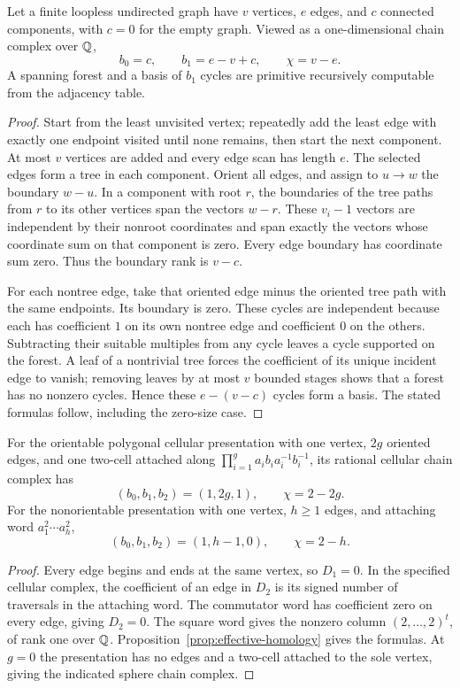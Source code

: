 \begin{theorem}
\label{thm:graph-betti}
Let a finite loopless undirected graph have $v$ vertices, $e$ edges, and
$c$ connected components, with $c=0$ for the empty graph.  Viewed as a
one-dimensional chain complex over $\mathbb Q$,
\[
 b_0=c,\qquad b_1=e-v+c,\qquad \chi=v-e.
\]
A spanning forest and a basis of $b_1$ cycles are primitive recursively
computable from the adjacency table.
\end{theorem}
\begin{proof}
Start from the least unvisited vertex; repeatedly add the least edge with
exactly one endpoint visited until none remains, then start the next
component.  At most $v$ vertices are added and every edge scan has length
$e$.  The selected edges form a tree in each component.  Orient all
edges, and assign to $u\to w$ the boundary $w-u$.  In a component with
root $r$, the boundaries of the tree paths from $r$ to its other vertices
span the vectors $w-r$.  These $v_i-1$ vectors are independent by their
nonroot coordinates and span exactly the vectors whose coordinate sum on
that component is zero.  Every edge boundary has coordinate sum zero.
Thus the boundary rank is $v-c$.

For each nontree edge, take that oriented edge minus the oriented tree
path with the same endpoints.  Its boundary is zero.  These cycles are
independent because each has coefficient $1$ on its own nontree edge
and coefficient $0$ on the others.  Subtracting their suitable multiples
from any cycle leaves a cycle supported on the forest.  A leaf of a
nontrivial tree forces the coefficient of its unique incident edge to
vanish; removing leaves by at most $v$ bounded stages shows that a forest
has no nonzero cycles.  Hence these $e-(v-c)$ cycles form a basis.
The stated formulas follow, including the zero-size case.
\end{proof}

\begin{proposition}
\label{prop:polygon-genus}
For the orientable polygonal cellular presentation with one vertex,
$2g$ oriented edges, and one two-cell attached along
$\prod_{i=1}^{g}a_i b_i a_i^{-1}b_i^{-1}$, its rational cellular chain
complex has
\[
 (b_0,b_1,b_2)=(1,2g,1),\qquad \chi=2-2g.
\]
For the nonorientable presentation with one vertex, $h\geq1$ edges, and
attaching word $a_1^2\cdots a_h^2$,
\[
 (b_0,b_1,b_2)=(1,h-1,0),\qquad \chi=2-h.
\]
\end{proposition}
\begin{proof}
Every edge begins and ends at the same vertex, so $D_1=0$.  In the
specified cellular complex, the coefficient of an edge in $D_2$ is its
signed number of traversals in the attaching word.  The commutator word
has coefficient zero on every edge, giving $D_2=0$.  The square word gives
the nonzero column $(2,\ldots,2)^t$, of rank one over $\mathbb Q$.
Proposition~\ref{prop:effective-homology} gives the formulas.  At $g=0$
the presentation has no edges and a two-cell attached to the sole vertex,
giving the indicated sphere chain complex.
\end{proof}

